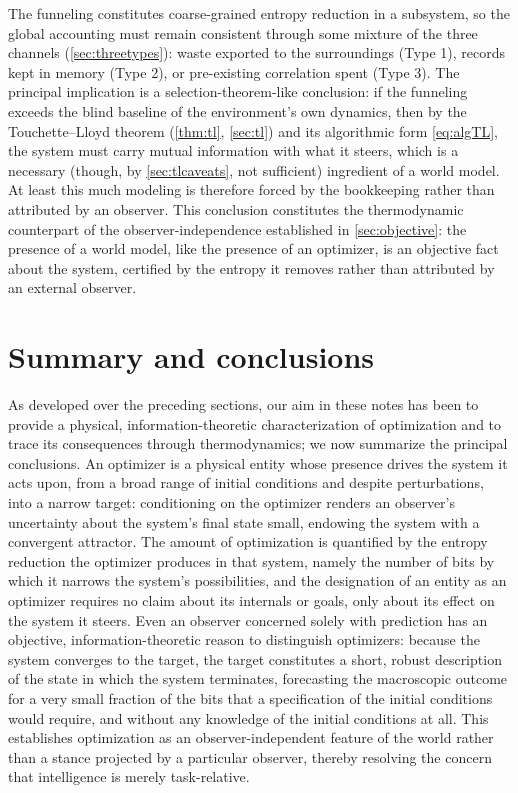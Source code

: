 \documentclass[11pt]{article}
\begin{document}
The funneling constitutes coarse-grained entropy reduction in a subsystem, so the global accounting must remain consistent through some mixture of the three channels (\cref{sec:threetypes}): waste exported to the surroundings (Type 1), records kept in memory (Type 2), or pre-existing correlation spent (Type 3). The principal implication is a selection-theorem-like conclusion: if the funneling exceeds the blind baseline of the environment's own dynamics, then by the Touchette--Lloyd theorem (\cref{thm:tl}, \cref{sec:tl}) and its algorithmic form \eqref{eq:algTL}, the system must carry mutual information with what it steers, which is a necessary (though, by \cref{sec:tlcaveats}, not sufficient) ingredient of a world model. At least this much modeling is therefore forced by the bookkeeping rather than attributed by an observer. This conclusion constitutes the thermodynamic counterpart of the observer-independence established in \cref{sec:objective}: the presence of a world model, like the presence of an optimizer, is an objective fact about the system, certified by the entropy it removes rather than attributed by an external observer.
\section{Summary and conclusions}
\label{sec:takeaways}

As developed over the preceding sections, our aim in these notes has been to provide a physical, information-theoretic characterization of optimization and to trace its consequences through thermodynamics; we now summarize the principal conclusions. An optimizer is a physical entity whose presence drives the system it acts upon, from a broad range of initial conditions and despite perturbations, into a narrow target: conditioning on the optimizer renders an observer's uncertainty about the system's final state small, endowing the system with a convergent attractor. The amount of optimization is quantified by the entropy reduction the optimizer produces in that system, namely the number of bits by which it narrows the system's possibilities, and the designation of an entity as an optimizer requires no claim about its internals or goals, only about its effect on the system it steers. Even an observer concerned solely with prediction has an objective, information-theoretic reason to distinguish optimizers: because the system converges to the target, the target constitutes a short, robust description of the state in which the system terminates, forecasting the macroscopic outcome for a very small fraction of the bits that a specification of the initial conditions would require, and without any knowledge of the initial conditions at all. This establishes optimization as an observer-independent feature of the world rather than a stance projected by a particular observer, thereby resolving the concern that intelligence is merely task-relative.
\end{document}
